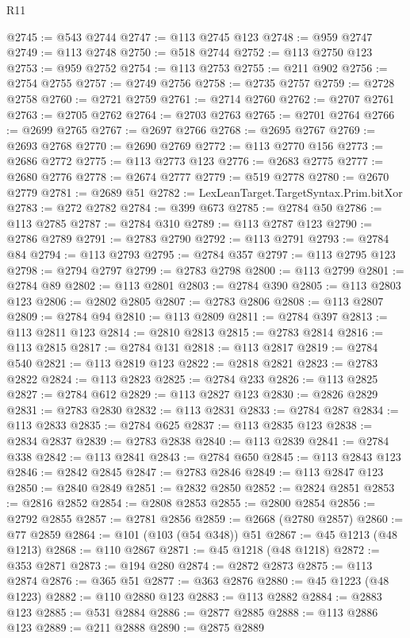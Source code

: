 \begin{lexlean}{R11}
\begin{coremodule}
{{{{{{{{{{{{{{{{{{{{{{{{{{{{{{{{{{{{{{{{{{{{{{{{{{{{{{{{{{{{{{{{{{{{{{{{{{{{{{{{{{{{{{{{{{{{{{{{{{{{{{{{{{@2745 := @543 @2744
@2747 := @113 @2745 @123
@2748 := @959 @2747
@2749 := @113 @2748
@2750 := @518 @2744
@2752 := @113 @2750 @123
@2753 := @959 @2752
@2754 := @113 @2753
@2755 := @211 @902
@2756 := @2754 @2755
@2757 := @2749 @2756
@2758 := @2735 @2757
@2759 := @2728 @2758
@2760 := @2721 @2759
@2761 := @2714 @2760
@2762 := @2707 @2761
@2763 := @2705 @2762
@2764 := @2703 @2763
@2765 := @2701 @2764
@2766 := @2699 @2765
@2767 := @2697 @2766
@2768 := @2695 @2767
@2769 := @2693 @2768
@2770 := @2690 @2769
@2772 := @113 @2770 @156
@2773 := @2686 @2772
@2775 := @113 @2773 @123
@2776 := @2683 @2775
@2777 := @2680 @2776
@2778 := @2674 @2777
@2779 := @519 @2778
@2780 := @2670 @2779
@2781 := @2689 @51
@2782 := LexLeanTarget.TargetSyntax.Prim.bitXor
@2783 := @272 @2782
@2784 := @399 @673
@2785 := @2784 @50
@2786 := @113 @2785
@2787 := @2784 @310
@2789 := @113 @2787 @123
@2790 := @2786 @2789
@2791 := @2783 @2790
@2792 := @113 @2791
@2793 := @2784 @84
@2794 := @113 @2793
@2795 := @2784 @357
@2797 := @113 @2795 @123
@2798 := @2794 @2797
@2799 := @2783 @2798
@2800 := @113 @2799
@2801 := @2784 @89
@2802 := @113 @2801
@2803 := @2784 @390
@2805 := @113 @2803 @123
@2806 := @2802 @2805
@2807 := @2783 @2806
@2808 := @113 @2807
@2809 := @2784 @94
@2810 := @113 @2809
@2811 := @2784 @397
@2813 := @113 @2811 @123
@2814 := @2810 @2813
@2815 := @2783 @2814
@2816 := @113 @2815
@2817 := @2784 @131
@2818 := @113 @2817
@2819 := @2784 @540
@2821 := @113 @2819 @123
@2822 := @2818 @2821
@2823 := @2783 @2822
@2824 := @113 @2823
@2825 := @2784 @233
@2826 := @113 @2825
@2827 := @2784 @612
@2829 := @113 @2827 @123
@2830 := @2826 @2829
@2831 := @2783 @2830
@2832 := @113 @2831
@2833 := @2784 @287
@2834 := @113 @2833
@2835 := @2784 @625
@2837 := @113 @2835 @123
@2838 := @2834 @2837
@2839 := @2783 @2838
@2840 := @113 @2839
@2841 := @2784 @338
@2842 := @113 @2841
@2843 := @2784 @650
@2845 := @113 @2843 @123
@2846 := @2842 @2845
@2847 := @2783 @2846
@2849 := @113 @2847 @123
@2850 := @2840 @2849
@2851 := @2832 @2850
@2852 := @2824 @2851
@2853 := @2816 @2852
@2854 := @2808 @2853
@2855 := @2800 @2854
@2856 := @2792 @2855
@2857 := @2781 @2856
@2859 := @2668 (@2780 @2857)
@2860 := @77 @2859
@2864 := @101 (@103 (@54 @348)) @51
@2867 := @45 @1213 (@48 @1213)
@2868 := @110 @2867
@2871 := @45 @1218 (@48 @1218)
@2872 := @353 @2871
@2873 := @194 @280
@2874 := @2872 @2873
@2875 := @113 @2874
@2876 := @365 @51
@2877 := @363 @2876
@2880 := @45 @1223 (@48 @1223)
@2882 := @110 @2880 @123
@2883 := @113 @2882
@2884 := @2883 @123
@2885 := @531 @2884
@2886 := @2877 @2885
@2888 := @113 @2886 @123
@2889 := @211 @2888
@2890 := @2875 @2889
}}}}}}}}}}}}}}}}}}}}}}}}}}}}}}}}}}}}}}}}}}}}}}}}}}}}}}}}}}}}}}}}}}}}}}}}}}}}}}}}}}}}}}}}}}}}}}}}}}}}}}}}}}
\end{coremodule}
\end{lexlean}
